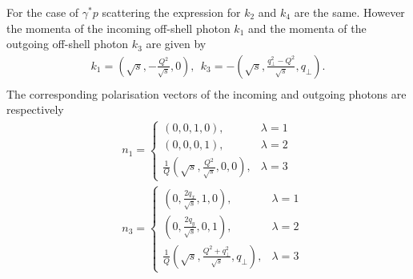 \documentclass[a4paper,12pt]{article}
\begin{document}
For the case of $\gamma^{*} p$ scattering the expression for $k_2$ and $k_4$ are the same. However the momenta of the incoming off-shell photon $k_1$ and the momenta of the outgoing off-shell photon $k_3$ are given by
\begin{align}
\label{eq:gammap_kinematics}
k_1=\left(\!\sqrt{s},-\frac{Q^2}{\sqrt{s}} ,0\right),\  \ k_3=-\left(\!\sqrt{s},\frac{ q_\perp^2 -Q^2}{\sqrt{s}} , q_\perp \right)\!.\\
\end{align}
The corresponding polarisation vectors of the incoming and outgoing photons are respectively
\begin{align}
&n_1=
    \begin{cases}
      \left(0,0,1,0\right), & \lambda=1 \\
      \left(0,0,0,1\right), & \lambda=2 \\
      \frac{1}{Q} \left( \sqrt{s}, \frac{Q^2}{\sqrt{s}}, 0, 0 \right), & \lambda = 3
    \end{cases} \\
 &n_3=
    \begin{cases}
      \left(0,\frac{2 q_x}{\sqrt{s}},1,0\right), & \lambda=1 \\
      \left(0,\frac{2 q_y}{\sqrt{s}},0,1\right), & \lambda=2 \\
      \frac{1}{Q} \left(\sqrt{s}, \frac{Q^2+q_\perp^2}{\sqrt{s}}, q_\perp \right), & \lambda = 3
    \end{cases}   
\end{align}
\end{document}
